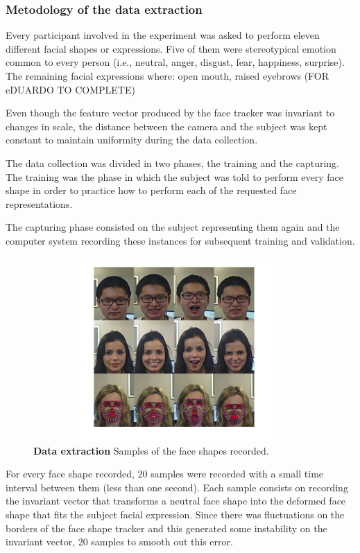\documentclass[]{article}
\begin{document}
\subsubsection{Metodology of the data extraction}
Every participant involved in the experiment was asked to perform eleven different facial shapes or expressions.
Five of them were stereotypical emotion common to every person (i.e., neutral, anger, disgust, fear, happiness,
surprise). The remaining facial expressions where: open mouth, raised eyebrows (FOR eDUARDO TO COMPLETE)

Even though the feature vector produced  by the face tracker was invariant to changes in scale, the distance
between the camera and the subject was kept constant to maintain uniformity during the data collection.

The data collection was divided in two phases, the training and the capturing. The training was the phase in which the
subject was told to perform every face shape in order to practice how to perform each of the requested face
representations.

The capturing phase consisted on the subject representing them again and the computer system recording these instances
for subsequent training and validation. 

\begin{figure}[ht]
\begin{center}
\vspace{-3mm}
\includegraphics[width=0.95\textwidth,height=70mm]{figures/dataExtrationExamples.jpg}
\end{center}
\caption{\textbf{Data extraction} Samples of the face shapes recorded.}
\label{figureLabel}
\end{figure}

For every face shape recorded, 20 samples were recorded with a small time
interval between them (less than one second). Each sample consists on recording
the invariant vector that transforms a neutral face shape into the deformed
face shape that fits the subject facial expression. Since there was fluctuations on the borders
of the face shape tracker and this generated some instability on the
invariant vector, 20 samples to smooth out this error.
\end{document}
